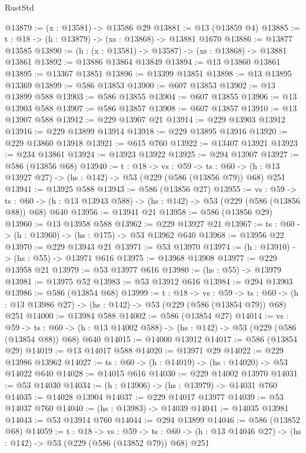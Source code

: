 \begin{lexlean}{RustStd}
\begin{coremodule}
@13879 := (x : @13581) -> @13586 @29
@13881 := @13 (@13859 @4)
@13885 := {t : @18} -> (h : @13879) -> (xs : @13868) -> @13881 @1670
@13886 := @13877 @13585
@13890 := (h : (x : @13581) -> @13587) -> (xs : @13868) -> @13881 @13861
@13892 := @13886 @13864 @13849
@13894 := @13 @13860 @13861
@13895 := @13367 @13851
@13896 := @13399 @13851
@13898 := @13 @13895 @13369
@13899 := @586 @13853
@13900 := @607 @13853
@13902 := @13 @13899 @588
@13903 := @586 @13855
@13904 := @607 @13855
@13906 := @13 @13903 @588
@13907 := @586 @13857
@13908 := @607 @13857
@13910 := @13 @13907 @588
@13912 := @229 @13907 @21
@13914 := @229 @13903 @13912
@13916 := @229 @13899 @13914
@13918 := @229 @13895 @13916
@13920 := @229 @13860 @13918
@13921 := @615 @760
@13922 := @13407 @13921
@13923 := @234 @13861
@13924 := @13923 @13922
@13925 := @294 @13907
@13927 := @586 (@13856 @68)
@13940 := {t : @18} ->
  {vs : @59} ->
  {ts : @60} -> (h : @13 @13927 @27) -> (hs : @142) -> @53 (@229 (@586 (@13856 @79)) @68) @251
@13941 := @13925 @588
@13943 := @586 (@13856 @27)
@13955 := {vs : @59} ->
  {ts : @60} -> (h : @13 @13943 @588) -> (hs : @142) -> @53 (@229 (@586 (@13856 @88)) @68) @640
@13956 := @13941 @21
@13958 := @586 (@13856 @29)
@13960 := @13 @13958 @588
@13962 := @229 @13927 @21
@13967 := {ts : @60} -> (h : @13960) -> (hs : @175) -> @53 @13962 @640
@13968 := @13956 @22
@13970 := @229 @13943 @21
@13971 := @53 @13970
@13974 := (h : @13910) -> (hs : @55) -> @13971 @616
@13975 := @13968 @13908
@13977 := @229 @13958 @21
@13979 := @53 @13977 @616
@13980 := (hs : @55) -> @13979
@13981 := @13975 @52
@13983 := @53 @13912 @616
@13984 := @294 @13903
@13986 := @586 (@13854 @68)
@13999 := {t : @18} ->
  {vs : @59} ->
  {ts : @60} -> (h : @13 @13986 @27) -> (hs : @142) -> @53 (@229 (@586 (@13854 @79)) @68) @251
@14000 := @13984 @588
@14002 := @586 (@13854 @27)
@14014 := {vs : @59} ->
  {ts : @60} -> (h : @13 @14002 @588) -> (hs : @142) -> @53 (@229 (@586 (@13854 @88)) @68) @640
@14015 := @14000 @13912
@14017 := @586 (@13854 @29)
@14019 := @13 @14017 @588
@14020 := @13971 @29
@14022 := @229 @13986 @13962
@14027 := {ts : @60} -> (h : @14019) -> (hs : @14020) -> @53 @14022 @640
@14028 := @14015 @616
@14030 := @229 @14002 @13970
@14031 := @53 @14030
@14034 := (h : @13906) -> (hs : @13979) -> @14031 @760
@14035 := @14028 @13904
@14037 := @229 @14017 @13977
@14039 := @53 @14037 @760
@14040 := (hs : @13983) -> @14039
@14041 := @14035 @13981
@14043 := @53 @13914 @760
@14044 := @294 @13899
@14046 := @586 (@13852 @68)
@14059 := {t : @18} ->
  {vs : @59} ->
  {ts : @60} -> (h : @13 @14046 @27) -> (hs : @142) -> @53 (@229 (@586 (@13852 @79)) @68) @251

\end{coremodule}
\end{lexlean}
